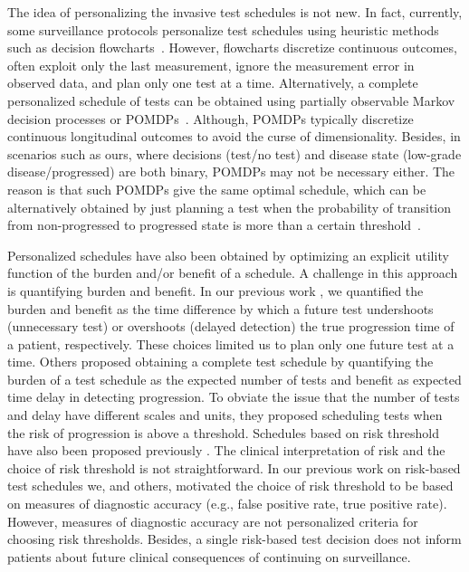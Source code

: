 \documentclass[AMA,STIX1COL]{WileyNJD-v2}
\begin{document}
The idea of personalizing the invasive test schedules is not new. In fact, currently, some surveillance protocols personalize test schedules using heuristic methods such as decision flowcharts~\citep{bokhorst2015compliance,weusten2017endoscopic}. However, flowcharts discretize continuous outcomes, often exploit only the last measurement, ignore the measurement error in observed data, and plan only one test at a time. Alternatively, a complete personalized schedule of tests can be obtained using partially observable Markov decision processes or POMDPs~\citep{alagoz2010operations,steimle2017markov}. Although, POMDPs typically discretize continuous longitudinal outcomes to avoid the curse of dimensionality. Besides, in scenarios such as ours, where decisions (test/no test) and disease state (low-grade disease/progressed) are both binary, POMDPs may not be necessary either. The reason is that such POMDPs give the same optimal schedule, which can be alternatively obtained by just planning a test when the probability of transition from non-progressed to progressed state is more than a certain threshold~\cite[see][Equation~1]{vickers2006decision}. 

Personalized schedules have also been obtained by optimizing an explicit utility function of the burden and/or benefit of a schedule. A challenge in this approach is quantifying burden and benefit. In our previous work \citep{tomer2019personalizedbiometrics}, we quantified the burden and benefit as the time difference by which a future test undershoots (unnecessary test) or overshoots (delayed detection) the true progression time of a patient, respectively. These choices limited us to plan only one future test at a time. Others \citep{bebu2017optimal} proposed obtaining a complete test schedule by quantifying the burden of a test schedule as the expected number of tests and benefit as expected time delay in detecting progression. To obviate the issue that the number of tests and delay have different scales and units, they proposed scheduling tests when the risk of progression is above a threshold. Schedules based on risk threshold have also been proposed previously \citep{vickers2006decision,rizopoulos2015personalized}. The clinical interpretation of risk and the choice of risk threshold is not straightforward. In our previous work on risk-based test schedules \citep{tomer2019personalized} we, and others\citep{wang2019learning}, motivated the choice of risk threshold to be based on measures of diagnostic accuracy (e.g., false positive rate, true positive rate). However, measures of diagnostic accuracy are not personalized criteria for choosing risk thresholds. Besides, a single risk-based test decision does not inform patients about future clinical consequences of continuing on surveillance.
\end{document}
